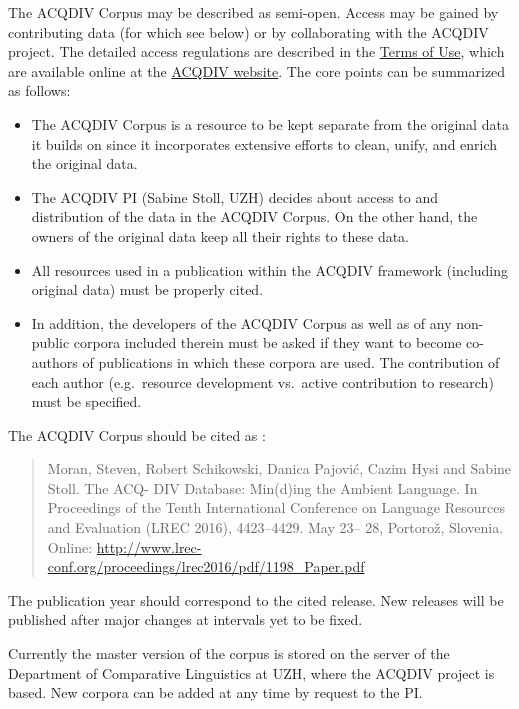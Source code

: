 \documentclass[a4paper, 11pt]{book}
\begin{document}
The ACQDIV Corpus may be described as semi-open. Access may be gained by contributing data (for which see below) or by collaborating with the ACQDIV project. The detailed access regulations are described in the \href{http://www.acqdiv.uzh.ch/dam/jcr:c7318751-f531-43a8-9dbd-b48eee950a4c/terms_of_use_for_the_acqdiv_corpus.pdf}{Terms of Use}, which are available online at the \href{http://www.acqdiv.uzh.ch/en/resources.html}{ACQDIV website}. The core points can be summarized as follows: 

\begin{itemize}
	\item The ACQDIV Corpus is a resource to be kept separate from the original data it builds on since it incorporates extensive efforts to clean, unify, and enrich the original data.
	\item The ACQDIV PI (Sabine Stoll, UZH) decides about access to and distribution of the data in the ACQDIV Corpus. On the other hand, the owners of the original data keep all their rights to these data. 
	\item All resources used in a publication within the ACQDIV framework (including original data) must be properly cited.
	\item In addition, the developers of the ACQDIV Corpus as well as of any non-public corpora included therein must be asked if they want to become co-authors of publications in which these corpora are used. The contribution of each author (e.g.\ resource development vs.\ active contribution to research) must be specified. 
\end{itemize}

\noindent The ACQDIV Corpus should be cited as \cite{Moran_etal2016a}: 

\begin{quote}
Moran, Steven, Robert Schikowski, Danica Pajović, Cazim Hysi and Sabine Stoll. The ACQ- DIV Database: Min(d)ing the Ambient Language. In Proceedings of the Tenth International Conference on Language Resources and Evaluation (LREC 2016), 4423–4429. May 23– 28, Portorož, Slovenia. Online: \url{http://www.lrec-conf.org/proceedings/lrec2016/pdf/1198_Paper.pdf}
\end{quote}

The publication year should correspond to the cited release. New releases will be published after major changes at intervals yet to be fixed. 

Currently the master version of the corpus is stored on the server of the Department of Comparative Linguistics at UZH, where the ACQDIV project is based. New corpora can be added at any time by request to the PI. 
\end{document}
